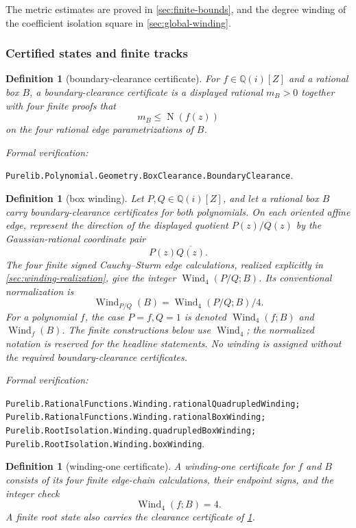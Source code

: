 \documentclass[11pt]{article}
\newtheorem{definition}[theorem]{Definition}
\newcommand{\Qi}{\mathbb{Q}(i)}
\newcommand{\Norm}[1]{\operatorname{N}\!\left(#1\right)}
\newcommand{\Wind}{\operatorname{Wind}}
\newcommand{\leanref}[1]{\par\smallskip\noindent
  \emph{Formal verification:}\par\nobreak
  {\raggedright\nolinkurl{#1}.\par}}
\begin{document}
The metric estimates are proved in \cref{sec:finite-bounds}, and the degree
winding of the coefficient isolation square in \cref{sec:global-winding}.

\subsubsection{Certified states and finite tracks}

\begin{definition}[boundary-clearance certificate]
\label{def:boundary-clearance}
For $f\in\Qi[Z]$ and a rational box $B$, a
\emph{boundary-clearance certificate} is a displayed rational $m_B>0$
together with four finite proofs that
\[
                 m_B\le\Norm{f(z)}
\]
on the four rational edge parametrizations of $B$.
\end{definition}

\leanref{Purelib.Polynomial.Geometry.BoxClearance.BoundaryClearance}

\begin{definition}[box winding]
\label{def:rational-function-winding}
Let $P,Q\in\Qi[Z]$, and let a rational box $B$ carry boundary-clearance
certificates for both polynomials.  On each oriented affine edge, represent
the direction of the displayed quotient $P(z)/Q(z)$ by the
Gaussian-rational coordinate pair
\[
                         P(z)\overline{Q(z)}.
\]
The four finite signed Cauchy--Sturm edge calculations,
realized explicitly in \cref{sec:winding-realization}, give the integer
$\Wind_4(P/Q;B)$.  Its conventional normalization is
\[
                         \Wind_{P/Q}(B)=\Wind_4(P/Q;B)/4.
\]
For a polynomial $f$, the case $P=f,Q=1$ is denoted
$\Wind_4(f;B)$ and $\Wind_f(B)$.  The finite constructions below use
$\Wind_4$; the normalized notation is reserved for the headline statements.
No winding is assigned without the required boundary-clearance certificates.
\end{definition}

\leanref{Purelib.RationalFunctions.Winding.rationalQuadrupledWinding;
Purelib.RationalFunctions.Winding.rationalBoxWinding;
Purelib.RootIsolation.Winding.quadrupledBoxWinding; Purelib.RootIsolation.Winding.boxWinding}

\begin{definition}[winding-one certificate]
\label{def:winding-one-certificate}
A \emph{winding-one certificate} for $f$ and $B$ consists of its four finite
edge-chain calculations, their endpoint signs, and the integer check
\[
                           \Wind_4(f;B)=4.
\]
A finite root state also carries the clearance certificate of
\cref{def:boundary-clearance}.
\end{definition}
\end{document}
